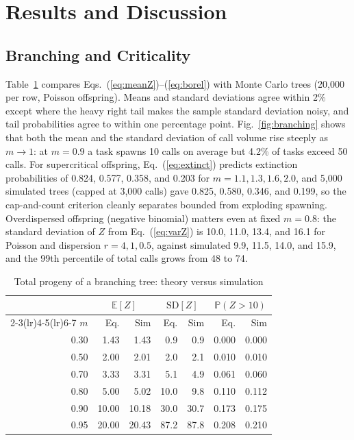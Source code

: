 \documentclass[journal]{IEEEtran}
\newcommand{\E}{\mathbb{E}}
\newcommand{\Prob}{\mathbb{P}}
\begin{document}
\section{Results and Discussion}\label{sec:results}
\subsection{Branching and Criticality}
Table~\ref{tab:branch} compares Eqs.~(\ref{eq:meanZ})--(\ref{eq:borel}) with Monte Carlo trees (20{,}000 per row, Poisson offspring). Means and standard deviations agree within 2\% except where the heavy right tail makes the sample standard deviation noisy, and tail probabilities agree to within one percentage point. Fig.~\ref{fig:branching} shows that both the mean and the standard deviation of call volume rise steeply as $m\to1$: at $m=0.9$ a task spawns 10 calls on average but 4.2\% of tasks exceed 50 calls. For supercritical offspring, Eq.~(\ref{eq:extinct}) predicts extinction probabilities of 0.824, 0.577, 0.358, and 0.203 for $m=1.1,1.3,1.6,2.0$, and 5{,}000 simulated trees (capped at 3{,}000 calls) gave 0.825, 0.580, 0.346, and 0.199, so the cap-and-count criterion cleanly separates bounded from exploding spawning. Overdispersed offspring (negative binomial) matters even at fixed $m=0.8$: the standard deviation of $Z$ from Eq.~(\ref{eq:varZ}) is 10.0, 11.0, 13.4, and 16.1 for Poisson and dispersion $r=4,1,0.5$, against simulated 9.9, 11.5, 14.0, and 15.9, and the 99th percentile of total calls grows from 48 to 74.
\begin{table}[t]
\caption{Total progeny of a branching tree: theory versus simulation}
\label{tab:branch}
\centering
\footnotesize
\setlength{\tabcolsep}{3.5pt}
\begin{tabular}{rrrrrrr}
\toprule
 & \multicolumn{2}{c}{$\E[Z]$} & \multicolumn{2}{c}{$\mathrm{SD}[Z]$} & \multicolumn{2}{c}{$\Prob(Z>10)$} \\
\cmidrule(lr){2-3}\cmidrule(lr){4-5}\cmidrule(lr){6-7}
$m$ & Eq. & Sim & Eq. & Sim & Eq. & Sim \\
\midrule
0.30 & 1.43 & 1.43 & 0.9 & 0.9 & 0.000 & 0.000 \\
0.50 & 2.00 & 2.01 & 2.0 & 2.1 & 0.010 & 0.010 \\
0.70 & 3.33 & 3.31 & 5.1 & 4.9 & 0.061 & 0.060 \\
0.80 & 5.00 & 5.02 & 10.0 & 9.8 & 0.110 & 0.112 \\
0.90 & 10.00 & 10.18 & 30.0 & 30.7 & 0.173 & 0.175 \\
0.95 & 20.00 & 20.43 & 87.2 & 87.8 & 0.208 & 0.210 \\
\bottomrule
\end{tabular}
\end{table}
\end{document}
